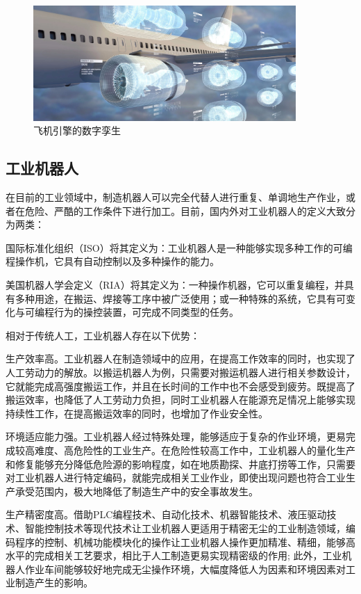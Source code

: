 \documentclass[lang=cn,12pt,bibtex,newtx,twoside,margintrue,citestyle=gb7714-2015, bibstyle=gb7714-2015]{elegantbook}
\begin{document}
\begin{figure}[htbp]
\centering
\includegraphics[angle=0,width=10cm]{./figure/2.7.jpg}
\caption{\label{2.7}飞机引擎的数字孪生}
\end{figure}

\subsection{工业机器人}
\label{sec:orgbdd8834}
在目前的工业领域中，制造机器人可以完全代替人进行重复、单调地生产作业，或者在危险、严酷的工作条件下进行加工。目前，国内外对工业机器人的定义大致分为两类\cite{王建兴2023}：

国际标准化组织（ISO）将其定义为：工业机器人是一种能够实现多种工作的可编程操作机，它具有自动控制以及多种操作的能力。

美国机器人学会定义（RIA）将其定义为：一种操作机器，它可以重复编程，并具有多种用途，在搬运、焊接等工序中被广泛使用；或一种特殊的系统，它具有可变化与可编程行为的操控装置，可完成不同类型的任务。

相对于传统人工，工业机器人存在以下优势\cite{周子又2023}：

生产效率高。工业机器人在制造领域中的应用，在提高工作效率的同时，也实现了人工劳动力的解放。以搬运机器人为例，只需要对搬运机器人进行相关参数设计，它就能完成高强度搬运工作，并且在长时间的工作中也不会感受到疲劳。既提高了搬运效率，也降低了人工劳动力负担，同时工业机器人在能源充足情况上能够实现持续性工作，在提高搬运效率的同时，也增加了作业安全性。

环境适应能力强。工业机器人经过特殊处理，能够适应于复杂的作业环境，更易完成较高难度、高危险性的工业生产。在危险性较高工作中，工业机器人的量化生产和修复能够充分降低危险源的影响程度，如在地质勘探、井底打捞等工作，只需要对工业机器人进行特定编码，就能完成相关工业作业，即使出现问题也符合工业生产承受范围内，极大地降低了制造生产中的安全事故发生。

生产精密度高。借助PLC编程技术、自动化技术、机器智能技术、液压驱动技术、智能控制技术等现代技术让工业机器人更适用于精密无尘的工业制造领域，编码程序的控制、机械功能模块化的操作让工业机器人操作更加精准、精细，能够高水平的完成相关工艺要求，相比于人工制造更易实现精密级的作用; 此外，工业机器人作业车间能够较好地完成无尘操作环境，大幅度降低人为因素和环境因素对工业制造产生的影响。
\end{document}
